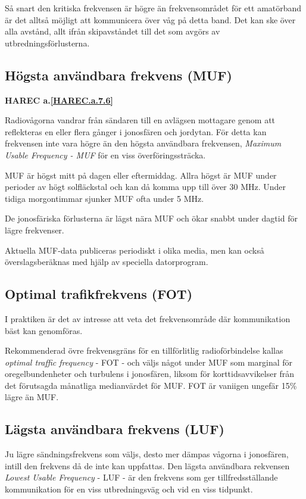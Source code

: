 Så snart den kritiska frekvensen är högre än frekvensområdet för ett
amatörband är det alltså möjligt att kommunicera över våg på detta
band. Det kan ske över alla avstånd, allt ifrån skipavståndet till det
som avgörs av utbredningsförlusterna.

\subsection{Högsta användbara frekvens (MUF)}
\textbf{
HAREC a.\ref{HAREC.a.7.6}\label{myHAREC.a.7.6}
}

Radiovågorna vandrar från sändaren till en avlägsen mottagare genom
att reflekteras en eller flera gånger i jonosfären och jordytan. För
detta kan frekvensen inte vara högre än den högsta användbara
frekvensen, \emph{Maximum Usable Frequency - MUF} för en viss
överföringssträcka.

MUF är högst mitt på dagen eller eftermiddag. Allra högst är MUF under
perioder av högt solfläckstal och kan då komma upp till över 30
MHz. Under tidiga morgontimmar sjunker MUF ofta under 5 MHz.

De jonosfäriska förlusterna är lägst nära MUF och ökar snabbt under
dagtid för lägre frekvenser.

Aktuella MUF-data publiceras periodiskt i olika media, men kan också
överslagsberäknas med hjälp av speciella datorprogram.

\subsection{Optimal trafikfrekvens (FOT)}

I praktiken är det av intresse att veta det frekvensområde där
kommunikation bäst kan genomföras.

Rekommenderad övre frekvensgräns för en tillförlitlig radioförbindelse
kallas \emph{optimal traffic frequency} - FOT - och väljs något under
MUF som marginal för oregelbundenheter och turbulens i jonosfären,
liksom för korttidsavvikelser från det förutsagda månatliga
medianvärdet för MUF. FOT är vaniigen ungefär 15\% lägre än MUF.

\subsection{Lägsta användbara frekvens (LUF)}

Ju lägre sändningsfrekvens som väljs, desto mer dämpas vågorna i
jonosfären, intill den frekvens då de inte kan uppfattas. Den lägsta
användbara rekvensen \emph{Lowest Usable Frequency} - LUF - är den
frekvens som ger tillfredsställande kommunikation för en viss
utbredningsväg och vid en viss tidpunkt.

